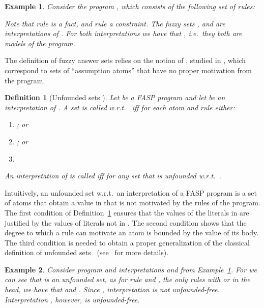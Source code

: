 \documentclass{tlp}
\newtheorem{definition}{Definition}
\newtheorem{example}{Example}
\begin{document}
\begin{example}\label{ex:prog1}
 Consider the program , which consists of the following set of rules:
 
 Note that rule  is a fact, and rule  a constraint.
The fuzzy sets , and  are interpretations of .
For both interpretations we have that , i.e.~they both are models of the program.
\end{example}







The definition of fuzzy answer sets relies on the notion of , studied in \cite{FASP:amai}, which correspond to sets of ``assumption atoms'' that have no proper motivation from the program.

\begin{definition}[Unfounded sets \cite{FASP:amai}]\label{def:unfounded}
 Let  be a FASP program and let  be an interpretation of . A set  is called  w.r.t.~ iff for each atom  and rule  either:
  \begin{enumerate}
   \item ; or
   \item ; or
   \item 
  \end{enumerate}
 An interpretation  of  is called  iff  for any set  that is unfounded w.r.t.~.
\end{definition}

Intuitively, an unfounded set w.r.t.~an interpretation  of a FASP program  is a set of atoms that obtain a value in  that is not motivated by the rules of the program. The first condition of Definition~\ref{def:unfounded} ensures that the values of the literals in  are justified by the values of literals not in .
 The second condition shows that the degree to which a rule can motivate an atom is bounded by the value of its body. The third condition is needed to obtain a proper generalization of the classical definition of unfounded sets~\cite{BaralBook} (see~\cite{FASP:amai} for more details).



\begin{example}\label{ex:prog1-unfounded}
 Consider program  and interpretations  and  from Example~\ref{ex:prog1}. For  we can see that  is an unfounded set, as for rule  and , the only rules with  or  in the head, we have that  and . Since , interpretation  is not unfounded-free. Interpretation , however, is unfounded-free.
\end{example}
\end{document}
